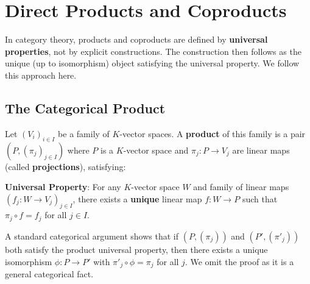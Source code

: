 
\newpage
\section{Direct Products and Coproducts}

\begin{remark}
    In category theory, products and coproducts are defined by \textbf{universal properties},
    not by explicit constructions. The construction then follows as the unique (up to isomorphism)
    object satisfying the universal property. We follow this approach here.
\end{remark}

\subsection{The Categorical Product}

\begin{definition}
\label{def:categorical-product}
    Let $(V_i)_{i \in I}$ be a family of $K$-vector spaces. A \textbf{product} of this family
    is a pair $\left(P, (\pi_j)_{j \in I}\right)$ where $P$ is a $K$-vector space and
    $\pi_j: P \to V_j$ are linear maps (called \textbf{projections}), satisfying:
    
    \textbf{Universal Property}: For any $K$-vector space $W$ and family of linear maps 
    $(f_j: W \to V_j)_{j \in I}$, there exists a \textbf{unique} linear map 
    $f: W \to P$ such that $\pi_j \circ f = f_j$ for all $j \in I$.
    
    \begin{center}
    \end{center}
\end{definition}

\begin{remark}
    A standard categorical argument shows that if $(P, (\pi_j))$ and $(P', (\pi'_j))$ both
    satisfy the product universal property, then there exists a unique isomorphism $\phi: P \to P'$
    with $\pi'_j \circ \phi = \pi_j$ for all $j$. We omit the proof as it is a general
    categorical fact.
\end{remark}

